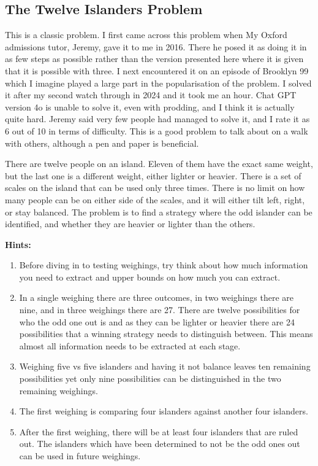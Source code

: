 
\subsection{The Twelve Islanders Problem}

This is a classic problem. I first came across this problem when My Oxford admissions tutor, Jeremy, gave it to me in 2016. There he posed it as doing it in as few steps as possible rather than the version presented here where it is given that it is possible with three. I next encountered it on an episode of Brooklyn 99 which I imagine played a large part in the popularisation of the problem. I solved it after my second watch through in 2024 and it took me an hour. Chat GPT version 4o is unable to solve it, even with prodding, and I think it is actually quite hard. Jeremy said very few people had managed to solve it, and I rate it as 6 out of 10 in terms of difficulty. This is a good problem to talk about on a walk with others, although a pen and paper is beneficial.

There are twelve people on an island. Eleven of them have the exact same weight, but the last one is a different weight, either lighter or heavier. There is a set of scales on the island that can be used only three times. There is no limit on how many people can be on either side of the scales, and it will either tilt left, right, or stay balanced. The problem is to find a strategy where the odd islander can be identified, and whether they are heavier or lighter than the others.

\textbf{Hints:}

\begin{enumerate}
	\item Before diving in to testing weighings, try think about how much information you need to extract and upper bounds on how much you can extract.
	\item In a single weighing there are three outcomes, in two weighings there are nine, and in three weighings there are 27. There are twelve possibilities for who the odd one out is and as they can be lighter or heavier there are 24 possibilities that a winning strategy needs to distinguish between. This means almost all information needs to be extracted at each stage.
	\item Weighing five vs five islanders and having it not balance leaves ten remaining possibilities yet only nine possibilities can be distinguished in the two remaining weighings.
    \item The first weighing is comparing four islanders against another four islanders.
    \item After the first weighing, there will be at least four islanders that are ruled out. The islanders which have been determined to not be the odd ones out can be used in future weighings.
\end{enumerate}

